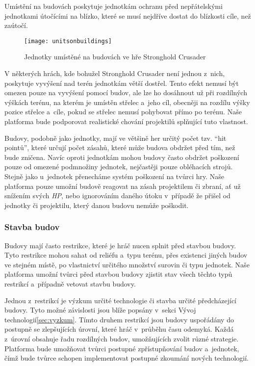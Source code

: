 Umístění na budovách poskytuje jednotkám ochranu před nepřátelskými jednotkami útočícími na blízko, které se musí nejdříve dostat do blízkosti cíle, než zaútočí. 

\begin{figure}[h]	
	\centering
	\texttt{[image: unitsonbuildings]}
	\caption{Jednotky umístěné na budovách ve hře Stronghold Crusader\citep{site:strongholdcrus}}
	\label{fig:unitsonbuildings}
\end{figure}

V některých hrách, kde bohužel Stronghold Crusader\citep{site:strongholdcrus} není jednou z~nich, poskytuje vyvýšení nad terén jednotkám větší dostřel. Tento efekt nemusí být omezen pouze na vyvýšení pomocí budov, ale lze ho dosáhnout už při rozdílných výškách terénu, na kterém je umístěn střelec a~jeho cíl, obecněji na rozdílu výšky pozice střelce a~cíle, pokud se střelec nemusí pohybovat přímo po terénu. Naše platforma bude podporovat realistické chování projektilů splňující tuto vlastnost. 

\done
{}
\done
{}

Budovy, podobně jako jednotky, mají ve většině her určitý počet tzv. ``hit pointů'', které určují počet zásahů, které může budova obdržet před tím, než bude zničena. Navíc oproti jednotkám mohou budovy často obdržet poškození pouze od omezené podmnožiny jednotek, nejčastěji pouze obléhacích strojů. Stejně jako u~jednotek přenecháme systém poškození na tvůrci hry. Naše platforma pouze umožní budově reagovat na zásah projektilem či zbraní, ať už snížením svých \textit{HP}, nebo ignorováním daného útoku v~případě že přišel od jednotky či projektilu, který danou budovu nemůže poškodit.


\subsubsection{Stavba budov}
\done
{}
Budovy mají často restrikce, které je hráč nucen splnit před stavbou budovy. Tyto restrikce mohou sahat od reliéfu a~typu terénu, přes existenci jiných budov ve stejném místě, po vlastnictví určitého množství surovin či typu jednotek. Naše platforma umožní tvůrci před stavbou budovy zjistit stav všech těchto typů restrikcí a~případně vetovat stavbu budovy. 

Jednou z~restrikcí je výzkum určité technologie či stavba určité předcházející budovy. Tyto možné závislosti jsou blíže popsány v~sekci Vývoj technologií\ref{sec:vyzkum}. Tímto druhem restrikcí jsou budovy uspořádány do postupně se zlepšujících úrovní, které hráč v~průběhu času odemyká. Každá z~úrovní obsahuje řadu rozdílných budov, umožňujících zvolit různé strategie. Platforma bude umožňovat tvůrci postupné zpřístupňování budov a~jednotek, čímž bude tvůrce schopen implementovat postupné zkoumání nových technologií.

